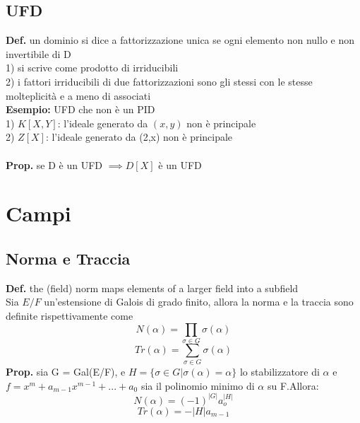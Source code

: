 \documentclass[10pt,a4paper]{article}
\begin{document}
\subsection{UFD}
\textbf{Def.} un dominio si dice a fattorizzazione unica se ogni elemento non nullo e non invertibile di D\\
1) si scrive come prodotto di irriducibili\\
2) i fattori irriducibili di due fattorizzazioni sono gli stessi con le stesse molteplicità e a meno di associati\\
\textbf{Esempio:} UFD che non è un PID\\
1) $K[X,Y]$: l'ideale generato da $(x,y)$ non è principale\\
2) $Z[X]$: l'ideale generato da (2,x) non è principale\\\\
\textbf{Prop.} se D è un UFD $ \implies D[X]$ è un UFD
\newpage
\section{Campi}
\subsection{Norma e Traccia}
\textbf{Def.} the (field) norm maps elements of a larger field into a subfield\\
Sia $E/F$ un'estensione di Galois di grado finito, allora la norma e la traccia sono definite rispettivamente come
$$N(\alpha) = \prod_{\sigma \in G} \sigma(\alpha)$$
$$ Tr(\alpha) = \sum_{\sigma \in G} \sigma(\alpha)$$
\textbf{Prop.} sia G = Gal(E/F), e $H = \{\sigma \in G | \sigma(\alpha) = \alpha\}$ lo stabilizzatore di $\alpha$ e\\ $f = x^m+a_{m-1}x^{m-1}+...+a_0$ sia il polinomio minimo di $\alpha$ su F.Allora:\\
$$N(\alpha) = (-1)^{|G|}a_o^{|H|}$$
$$Tr(\alpha) = - |H|a_{m-1}$$
\end{document}
